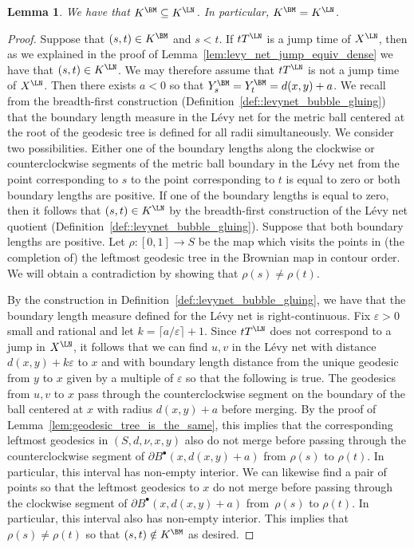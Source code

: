 \documentclass[10pt]{amsart}
\newcommand{\sbullet}{{\scriptscriptstyle\bullet}}
\let\epsilon\varepsilon
\theoremstyle{plain}
\numberwithin{theorem}{section}
\newtheorem{lemma}[theorem]{Lemma}
\theoremstyle{definition}
\newcommand{\fb}[2]{B^\sbullet(#1,#2)}
\begin{document}
\begin{lemma}
\label{lem:net_equiv_implies_levy_equiv}
We have that $K^\BM \subseteq K^\LN$. In particular, $K^\BM = K^\LN$.
\end{lemma}
\begin{proof}
Suppose that $(s,t) \in K^\BM$ and $s < t$. If $t T^\LN$ is a jump time of $X^\LN$, then as we explained in the proof of Lemma~\ref{lem:levy_net_jump_equiv_dense} we have that $(s,t) \in K^\LN$. We may therefore assume that $t T^\LN$ is not a jump time of $X^\LN$. Then there exists $a < 0$ so that $Y_s^\BM = Y_t^\BM = d(x,y)+a$. We recall from the breadth-first construction (Definition~\ref{def::levynet_bubble_gluing}) that the boundary length measure in the Lévy net for the metric ball centered at the root of the geodesic tree is defined for all radii simultaneously. We consider two possibilities. Either one of the boundary lengths along the clockwise or counterclockwise segments of the metric ball boundary in the Lévy net from the point corresponding to $s$ to the point corresponding to $t$ is equal to zero or both boundary lengths are positive. If one of the boundary lengths is equal to zero, then it follows that $(s,t) \in K^\LN$ by the breadth-first construction of the Lévy net quotient (Definition~\ref{def::levynet_bubble_gluing}). Suppose that both boundary lengths are positive. Let $\rho \colon [0,1] \to S$ be the map which visits the points in (the completion of) the leftmost geodesic tree in the Brownian map in contour order. We will obtain a contradiction by showing that $\rho(s) \neq \rho (t)$.

By the construction in Definition~\ref{def::levynet_bubble_gluing}, we have that the boundary length measure defined for the Lévy net is right-continuous. Fix $\epsilon > 0$ small and rational and let $k = \lceil a/\epsilon\rceil + 1$. Since $t T^\LN$ does not correspond to a jump in $X^\LN$, it follows that we can find $u,v$ in the Lévy net with distance $d(x,y)+ k \epsilon$ to $x$ and with boundary length distance from the unique geodesic from $y$ to $x$ given by a multiple of $\epsilon$ so that the following is true. The geodesics from $u,v$ to $x$ pass through the counterclockwise segment on the boundary of the ball centered at $x$ with radius $d(x,y)+a$ before merging. By the proof of Lemma~\ref{lem:geodesic_tree_is_the_same}, this implies that the corresponding leftmost geodesics in $(S,d,\nu,x,y)$ also do not merge before passing through the counterclockwise segment of $\partial \fb{x}{d(x,y)+a}$ from $\rho(s)$ to $\rho(t)$. In particular, this interval has non-empty interior. We can likewise find a pair of points so that the leftmost geodesics to $x$ do not merge before passing through the clockwise segment of $\partial \fb{x}{d(x,y)+a}$ from~$\rho(s)$ to $\rho(t)$. In particular, this interval also has non-empty interior. This implies that $\rho(s) \neq \rho(t)$ so that $(s,t) \notin K^\BM$ as desired.
\end{proof}
\end{document}
